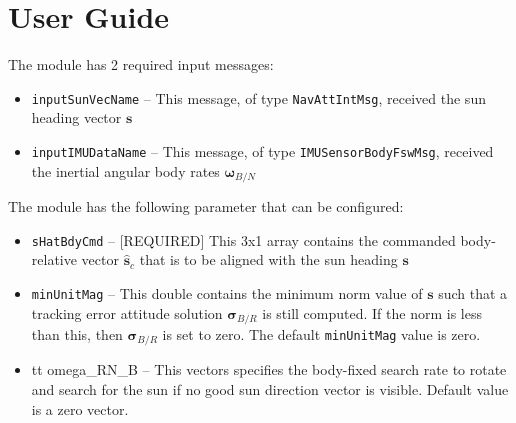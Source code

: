 
\section{User Guide}
The module has 2 required input messages:
\begin{itemize}
	\item {\tt inputSunVecName} -- This message, of type {\tt NavAttIntMsg}, received the sun heading vector $\bm s$
	\item {\tt inputIMUDataName} -- This message, of type {\tt IMUSensorBodyFswMsg}, received the inertial angular body rates $\bm \omega_{B/N}$
\end{itemize}

The module has the following parameter that can be configured:
\begin{itemize}
	\item {\tt sHatBdyCmd} -- [REQUIRED] This 3x1 array contains the commanded body-relative vector $\hat{\bm s}_{c}$ that is to be aligned with the sun heading $\bm s$
	
	\item {\tt minUnitMag} -- This double contains the minimum norm value of $\bm s$ such that a tracking error attitude solution $\bm\sigma_{B/R}$ is still computed.  If the norm is less than this, then $\bm\sigma_{B/R}$ is set to zero.    The default {\tt minUnitMag} value is zero. 
	
	\item {tt omega\_RN\_B} -- This vectors specifies the body-fixed search rate to rotate and search for the sun if no good sun direction vector is visible.  Default value is a zero vector.  
\end{itemize}

